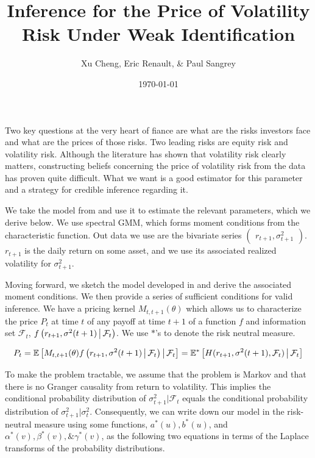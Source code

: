 \documentclass[11pt]{article}
\author{Xu Cheng, Eric Renault, \& Paul Sangrey}
\title{Inference for the Price of Volatility Risk Under Weak Identification}
\date{\today}
\newcommand*{\F}{\mathcal{F}}
\newcommand*{\E}{\mathbb{E}}
\newcommand{\mvert}[1][\middle]{\ensuremath{\,#1\vert\,}}
\begin{document}
\maketitle

Two key questions at the very heart of fiance are what are the risks investors face and what are the prices of
those risks.
Two leading risks are equity risk and volatility risk.
Although the literature has shown that volatility risk clearly matters, constructing beliefs concerning the price
of volatility risk from the data has proven quite difficult.
What we want is a good estimator for this parameter and a strategy for credible inference regarding it.  

We take the model from \textcite{khrapov2016affine} and use it to estimate the relevant
parameters, which we derive below. 
We use spectral GMM, which forms moment conditions from the characteristic function.
Out data we use are the bivariate series $\begin{pmatrix} r_{t+1}, \sigma^2_{t+1} \end{pmatrix}$.
$r_{t+1}$ is the daily return on some asset, and we use its associated realized volatility for $\sigma^2_{t+1}$.

Moving forward, we sketch the model developed in \textcite{khrapov2016affine} and derive the associated moment
conditions.
We then provide a series of sufficient conditions for valid inference. 
We have a pricing kernel $M_{t, t+1}(\theta)$ which allows us to characterize the price $P_t$ at time $t$ of any
payoff at time $t+1$ of a function $f$ and information set $\F_t$, $f\left(r_{t+1}, \sigma^2(t+1) \mvert
\F_t\right)$. 
We use $*$'s to denote the risk neutral measure.

\begin{equation}
    P_t  = \E\left[M_{t,t+1}(\theta) f\left(r_{t+1}, \sigma^2(t+1) \mvert  \F_t\right) \mvert \F_t \right] =
    \E^{*}\left[H(r_{t+1}, \sigma^2(t+1),  \F_t) \mvert \F_t \right] 
\end{equation}


To make the problem tractable, we assume that the problem is Markov and that there is no Granger causality from
return to volatility. 
This implies the conditional probability distribution of $\sigma^2_{t+1} \vert \F_t$ equals the conditional
probability distribution of $\sigma^2_{t+1} \vert \sigma^2_t$.
Consequently, we can write down our model in the risk-neutral measure using some functions, $a^{*}(u), b^{*}(u)$,
and $\alpha^{*}(v), \beta^{*}(v), \& \gamma^{*}(v)$, as the following two equations in terms of the Laplace
transforms of the probability distributions.
\end{document}
